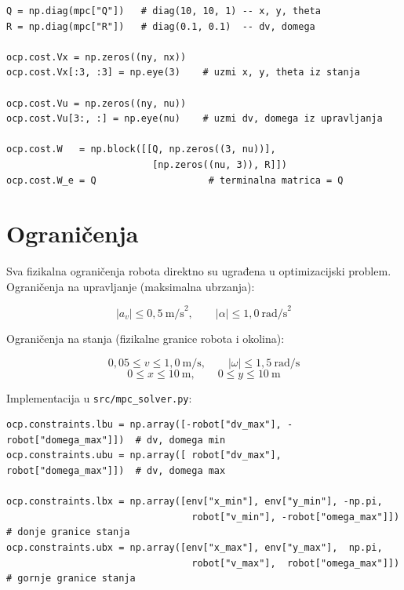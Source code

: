 \begin{listing}[H]
\begin{verbatim}
Q = np.diag(mpc["Q"])   # diag(10, 10, 1) -- x, y, theta
R = np.diag(mpc["R"])   # diag(0.1, 0.1)  -- dv, domega

ocp.cost.Vx = np.zeros((ny, nx))
ocp.cost.Vx[:3, :3] = np.eye(3)    # uzmi x, y, theta iz stanja

ocp.cost.Vu = np.zeros((ny, nu))
ocp.cost.Vu[3:, :] = np.eye(nu)    # uzmi dv, domega iz upravljanja

ocp.cost.W   = np.block([[Q, np.zeros((3, nu))],
                          [np.zeros((nu, 3)), R]])
ocp.cost.W_e = Q                    # terminalna matrica = Q
\end{verbatim}
\caption{Postavljanje matrica troška u \texttt{src/mpc\_solver.py}}
\end{listing}

\section{Ograničenja}

Sva fizikalna ograničenja robota direktno su ugrađena u optimizacijski problem. Ograničenja na upravljanje (maksimalna ubrzanja):

\begin{equation}
  |a_v| \leq 0{,}5 \ \text{m/s}^2, \qquad |\alpha| \leq 1{,}0 \ \text{rad/s}^2
\end{equation}

Ograničenja na stanja (fizikalne granice robota i okolina):

\begin{equation}
  0{,}05 \leq v \leq 1{,}0 \ \text{m/s}, \qquad |\omega| \leq 1{,}5 \ \text{rad/s}
\end{equation}
\begin{equation}
  0 \leq x \leq 10 \ \text{m}, \qquad 0 \leq y \leq 10 \ \text{m}
\end{equation}

Implementacija u \texttt{src/mpc\_solver.py}:

\begin{listing}[H]
\begin{verbatim}
ocp.constraints.lbu = np.array([-robot["dv_max"], -robot["domega_max"]])  # dv, domega min
ocp.constraints.ubu = np.array([ robot["dv_max"],  robot["domega_max"]])  # dv, domega max

ocp.constraints.lbx = np.array([env["x_min"], env["y_min"], -np.pi,
                                 robot["v_min"], -robot["omega_max"]])     # donje granice stanja
ocp.constraints.ubx = np.array([env["x_max"], env["y_max"],  np.pi,
                                 robot["v_max"],  robot["omega_max"]])     # gornje granice stanja
\end{verbatim}
\caption{Postavljanje ograničenja u \texttt{src/mpc\_solver.py}}
\end{listing}

